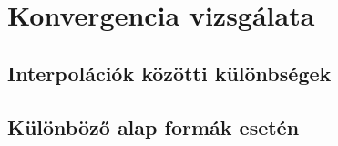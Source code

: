 \chapter{Konvergencia vizsgálata}
\section{Interpolációk közötti különbségek}




\section{Különböző alap formák esetén}



